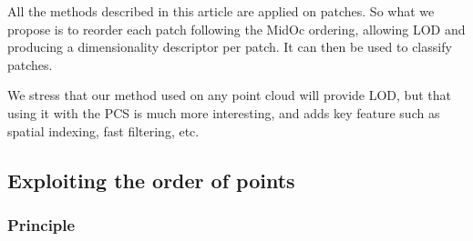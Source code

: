		All the methods described in this article are applied on patches.
		So what we propose is to reorder each patch following the MidOc ordering, allowing LOD and producing a dimensionality descriptor per patch. It can then be used to classify patches.
		
		We stress that our method used on any point cloud will provide LOD,
		but that using it with the PCS is much more interesting,
		and adds key feature such as spatial indexing, fast filtering, etc. 
	 
%	
%	 
%	 	
%	 	
%	 	 
	 	 
	\subsection{Exploiting the order of points}
		\label{method.order}
		\subsubsection{Principle} 
			
			
